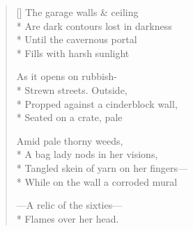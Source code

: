 \label{ch:bus_depot}
\settowidth{\versewidth}{Tangled skein of yarn on her fingers—}
\begin{verse}[\versewidth]
The garage walls \& ceiling\\*
Are dark contours lost in darkness\\*
Until the cavernous portal\\*
Fills with harsh sunlight

As it opens on rubbish-\\*
Strewn streets.     Outside,\\*
Propped against a cinderblock wall,\\*
Seated on a crate, pale

Amid pale thorny weeds,\\*
A bag lady nods in her visions,\\*
Tangled skein of yarn on her fingers---\\*
While on the wall a corroded mural

---A relic of the sixties---\\*
Flames over her head.
\end{verse}
